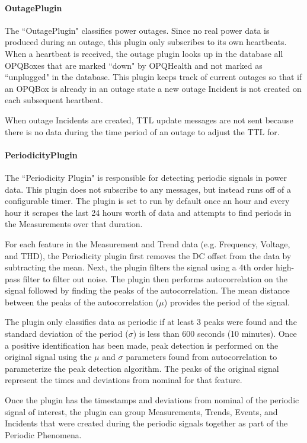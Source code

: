 \paragraph{OutagePlugin}
The ``OutagePlugin" classifies power outages. Since no real power data is produced during an outage, this plugin only subscribes to its own heartbeats. When a heartbeat is received, the outage plugin looks up in the database all OPQBoxes that are marked ``down" by OPQHealth and not marked as ``unplugged" in the database. This plugin keeps track of current outages so that if an OPQBox is already in an outage state a new outage Incident is not created on each subsequent heartbeat.

When outage Incidents are created, TTL update messages are not sent because there is no data during the time period of an outage to adjust the TTL for.

\paragraph{PeriodicityPlugin}

The ``Periodicity Plugin" is responsible for detecting periodic signals in power data. This plugin does not subscribe to any messages, but instead runs off of a configurable timer. The plugin is set to run by default once an hour and every hour it scrapes the last 24 hours worth of data and attempts to find periods in the Measurements over that duration.

For each feature in the Measurement and Trend data (e.g. Frequency, Voltage, and THD), the Periodicity plugin first removes the DC offset from the data by subtracting the mean. Next, the plugin filters the signal using a 4th order high-pass filter to filter out noise. The plugin then performs autocorrelation on the signal followed by finding the peaks of the autocorrelation. The mean distance between the peaks of the autocorrelation ($\mu$) provides the period of the signal.

The plugin only classifies data as periodic if at least 3 peaks were found and the standard deviation of the period ($\sigma$) is less than 600 seconds (10 minutes). Once a positive identification has been made, peak detection is performed on the original signal using the $\mu$ and $\sigma$ parameters found from autocorrelation to parameterize the peak detection algorithm. The peaks of the original signal represent the times and deviations from nominal for that feature.

Once the plugin has the timestamps and deviations from nominal of the periodic signal of interest, the plugin can group Measurements, Trends, Events, and Incidents that were created during the periodic signals together as part of the Periodic Phenomena.

